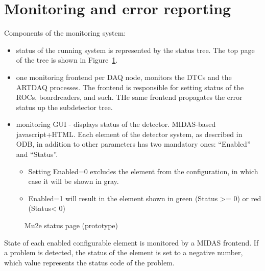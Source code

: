 \section{Monitoring and error reporting}

Components of the monitoring system:

\begin{itemize}
\item
  status of the running system is represented by the status tree. The top page
  of the tree is shown in Figure~\ref{figure:mu2e_status_page}.
\item
  one monitoring frontend per DAQ node, monitors the DTCs and the ARTDAQ processes.
  The frontend is responsible for setting status of the ROCs, boardreaders, and such.
  THe same frontend propagates the error status up the subdetector tree. 
  \item
  monitoring GUI - displays status of the detector. MIDAS-based javascript+HTML.
  Each element of the detector system, as described in ODB, in addition to other parameters
  has two mandatory ones: ``Enabled'' and ``Status''.
  \begin{itemize}
  \item 
    Setting Enabled=0 excludes the element from the configuration, in which case it will be
    shown in gray.
  \item
    Enabled=1 will result in the element shown in green (Status >= 0) or red (Status< 0) 
  \end{itemize}
\end{itemize}

\begin{figure}[H]
  \caption{
    \label{figure:mu2e_status_page}
    Mu2e status page (prototype)
  }
\end{figure}

State of each enabled configurable element is monitored by a MIDAS frontend.
If a problem is detected, the status of the element is set to a negative
number, which value represents the status code of the problem.

